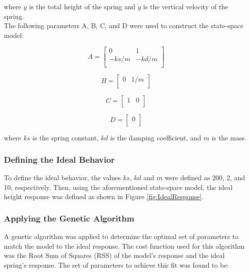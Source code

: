 \documentclass[conference]{article}
\begin{document}
where $y$ is the total height of the spring and $\dot{y}$ is the vertical velocity of the spring.\\

\noindent The following parameters A, B, C, and D were used to construct the state-space model:

\begin{equation}
A = \begin{bmatrix}
0 & 1 \\ -ks/m & -kd/m\\
\end{bmatrix}
\end{equation}

\begin{equation}
B = \begin{bmatrix}
0 & 1/m\\
\end{bmatrix}
\end{equation}

\begin{equation}
C = \begin{bmatrix}
1& 0\\
\end{bmatrix}
\end{equation}

\begin{equation}
D = \begin{bmatrix}
 0\\
\end{bmatrix}
\end{equation}

where $ks$ is the spring constant,  $kd$ is the damping coefficient, and  $m$ is the mass.

\subsubsection{Defining the Ideal Behavior}
\label{sec:Ideal}

To define the ideal behavior, the values $ks$, $kd$ and $m$ were defined as 200, 2, and 10, respectively. Then, using the aforementioned state-space model, the ideal height response was defined as shown in Figure \ref{fig:IdealResponse}. 

\subsubsection{Applying the Genetic Algorithm}
\label{sec:GA}

A genetic algorithm was applied to determine the optimal set of parameters to match the model to the ideal response. The cost function used for this algorithm was the Root Sum of Squares (RSS) of the model's response and the ideal spring's response. The set of parameters to achieve this fit was found to be:
\end{document}
